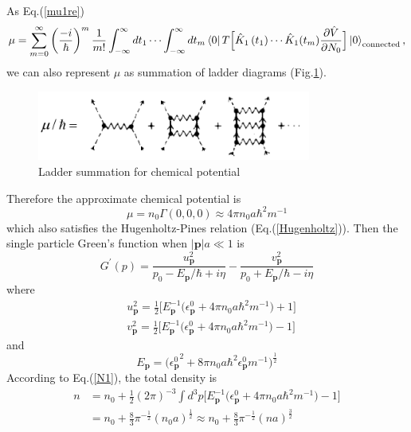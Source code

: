 \documentclass[12pt]{article}
\begin{document}
As Eq.(\ref{mu1re})
\begin{equation*}
    \mu=\sum_{m=0}^{\infty}\left(\frac{-i}{\hbar}\right)^{m} \frac{1}{m!}\int_
    {-\infty}^{\infty}dt_1\cdots \int_{-\infty}^{\infty}dt_m\bra*{0}T\Big[\hat{K}_1
    \left(t_{1}\right)\cdots\hat{K}_1(t_m) \frac{\partial\hat{V}}{\partial N_0}
    \Big] \ket*{0}_{\text{connected}},
\end{equation*}
we can also represent $\mu$ as summation of ladder diagrams (Fig.\ref{img11}).
\begin{figure}[H]
    \centering
    \includegraphics[width=9cm]{p11.png}
    \renewcommand{\figurename}{Fig.}
    \caption{Ladder summation for chemical potential}
    \label{img11}
\end{figure}
\noindent Therefore the approximate chemical potential is 
\begin{equation}
    \mu=n_0\Gamma(0,0,0)\approx 4\pi n_0a\hbar^2m^{-1}
\end{equation}
which also satisfies the Hugenholtz-Pines relation (Eq.(\ref{Hugenholtz})). Then the 
single particle Green's function when $|\mathbf{p}|a\ll 1$ is 
\begin{equation}
    G^{\prime}(p)=\frac{u_{\mathbf{p}}^{2}}{p_0-E_{\mathbf{p}}/\hbar+i\eta}-\frac
    {v_{\mathbf{p}}^{2}}{p_{0}+E_{\mathbf{p}} / \hbar-i \eta}
\end{equation}
where 
\begin{equation}
    \begin{split}
        &u_{\mathbf{p}}^{2}=\frac{1}{2}\big[E_{\mathbf{p}}^{-1}\big(\epsilon_{\mathbf{p}}^{0}+4\pi
        n_0a\hbar^{2} m^{-1}\big)+1\big]\\
        &v_{\mathbf{p}}^{2}=\frac{1}{2}\big[E_{\mathbf{p}}^{-1}\big(\epsilon_{\mathbf{p}}^0+4\pi
        n_{0} a \hbar^{2} m^{-1}\big)-1\big]
    \end{split}
\end{equation}
and 
\begin{equation}
    E_{\mathbf{p}}=\big({\epsilon_\mathbf{p}^0}^2+8\pi n_0a\hbar^{2}\epsilon_{
    \mathbf{p}}^0m^{-1}\big)^{\frac{1}{2}}
\end{equation}
According to Eq.(\ref{N1}), the total density is 
\begin{equation}
    \begin{aligned}
        n&=n_0+\frac{1}{2}(2 \pi)^{-3}\int d^3 p\big[E_{\mathbf{p}}^{-1}
        \big(\epsilon_{\mathbf{p}}^0+4\pi n_0a\hbar^2m^{-1}\big)-1\big] \\
        &=n_0+\frac{8}{3}\pi^{-\frac{1}{2}}(n_0a)^{\frac{1}{2}}\approx n_0+
        \frac{8}{3}\pi^{-\frac{1}{2}}(na)^{\frac{3}{2}}
        \end{aligned}
\end{equation}
\end{document}
